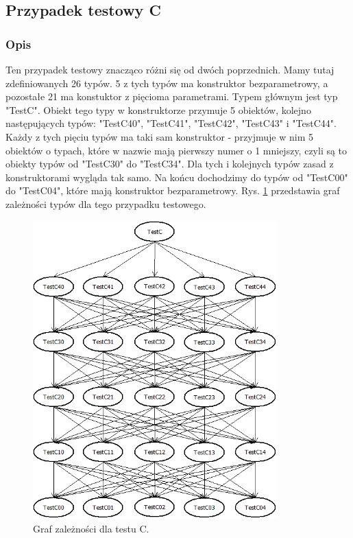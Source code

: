 \documentclass[12pt]{article}
\begin{document}
\subsection{Przypadek testowy C}
\subsubsection{Opis}
Ten przypadek testowy znacząco różni się od dwóch poprzednich. Mamy tutaj zdefiniowanych 26 typów. 5 z tych typów ma konstruktor bezparametrowy, a pozostałe 21 ma konstuktor z pięcioma parametrami. Typem głównym jest typ "TestC". Obiekt tego typy w konstruktorze przymuje 5 obiektów, kolejno następujących typów: "TestC40", "TestC41", "TestC42", "TestC43" i "TestC44". Każdy z tych pięciu typów ma taki sam konstruktor - przyjmuje w nim 5 obiektów o typach, które w nazwie mają pierwszy numer o 1 mniejszy, czyli są to obiekty typów od "TestC30" do "TestC34". Dla tych i kolejnych typów zasad z konstruktorami wygląda tak samo. Na końcu dochodzimy do typów od "TestC00" do "TestC04", które mają konstruktor bezparametrowy. Rys. \ref{fig:testC} przedstawia graf zależności typów dla tego przypadku testowego.\\
\begin{figure}[H]
	\begin{center}
  		\includegraphics[height=11.5cm]{TestC.png}
  		\caption{Graf zależności dla testu C.}
  		\label{fig:testC}
	\end{center}
\end{figure}
\end{document}
